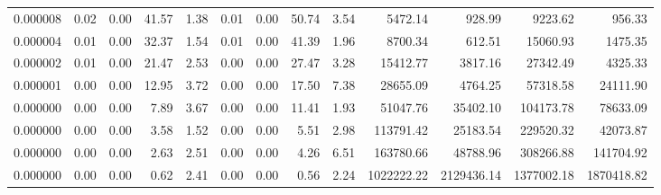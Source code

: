 \begin{tabular}{lrrrrrrrrrrrr}
0.000008 & 0.02 & 0.00 & 41.57 & 1.38 & 0.01 & 0.00 & 50.74 & 3.54 & 5472.14 & 928.99 & 9223.62 & 956.33 \\
0.000004 & 0.01 & 0.00 & 32.37 & 1.54 & 0.01 & 0.00 & 41.39 & 1.96 & 8700.34 & 612.51 & 15060.93 & 1475.35 \\
0.000002 & 0.01 & 0.00 & 21.47 & 2.53 & 0.00 & 0.00 & 27.47 & 3.28 & 15412.77 & 3817.16 & 27342.49 & 4325.33 \\
0.000001 & 0.00 & 0.00 & 12.95 & 3.72 & 0.00 & 0.00 & 17.50 & 7.38 & 28655.09 & 4764.25 & 57318.58 & 24111.90 \\
0.000000 & 0.00 & 0.00 & 7.89 & 3.67 & 0.00 & 0.00 & 11.41 & 1.93 & 51047.76 & 35402.10 & 104173.78 & 78633.09 \\
0.000000 & 0.00 & 0.00 & 3.58 & 1.52 & 0.00 & 0.00 & 5.51 & 2.98 & 113791.42 & 25183.54 & 229520.32 & 42073.87 \\
0.000000 & 0.00 & 0.00 & 2.63 & 2.51 & 0.00 & 0.00 & 4.26 & 6.51 & 163780.66 & 48788.96 & 308266.88 & 141704.92 \\
0.000000 & 0.00 & 0.00 & 0.62 & 2.41 & 0.00 & 0.00 & 0.56 & 2.24 & 1022222.22 & 2129436.14 & 1377002.18 & 1870418.82 \\
\bottomrule
\end{tabular}
